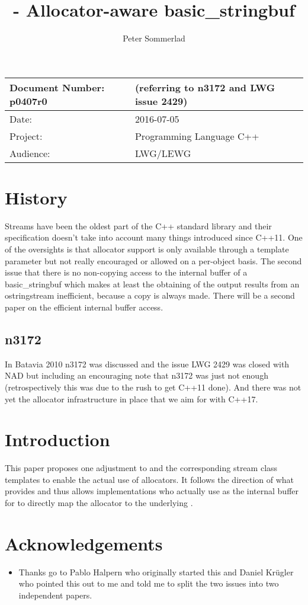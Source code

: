 \documentclass[ebook,11pt,article]{memoir}
\title{\papernumber{} - Allocator-aware basic\_stringbuf}
\author{Peter Sommerlad}
\date{\paperdate}                        %
\newcommand{\papernumber}{p0407r0}
\newcommand{\paperdate}{2016-07-05}
\begin{document}
\maketitle
\begin{tabular}[t]{|l|l|}\hline 
Document Number: \papernumber &   (referring to n3172 and LWG issue 2429)\\\hline
Date: & \paperdate \\\hline
Project: & Programming Language C++\\\hline 
Audience: & LWG/LEWG\\\hline
\end{tabular}

\chapter{History}
Streams have been the oldest part of the C++ standard library and their specification doesn't take into account many things introduced since C++11. One of  the oversights is that allocator support is only available through a template parameter but not really encouraged or allowed on a per-object basis. The second issue that there is no non-copying access to the internal buffer of a basic_stringbuf which makes at least the obtaining of the output results from an ostringstream inefficient, because a copy is always made. There will be a second paper on the efficient internal buffer access.
\section{n3172}
In Batavia 2010 n3172 was discussed and the issue LWG 2429 was closed with NAD but including an encouraging note that n3172 was just not enough (retrospectively this was due to the rush to get C++11 done). And there was not yet the allocator infrastructure in place that we aim for with C++17.


\chapter{Introduction}
This paper proposes one adjustment to  and the corresponding stream class templates to enable the actual use of allocators. It follows the direction of what  provides and thus allows implementations who actually use  as the internal buffer for  to directly map the allocator to the underlying .

\chapter{Acknowledgements}
\begin{itemize}
\item Thanks go to Pablo Halpern who originally started this and Daniel Kr\"ugler who pointed this out to me and told me to split the two issues into two independent papers.
\end{itemize}
\end{document}
